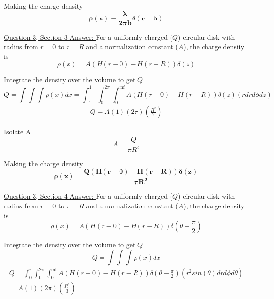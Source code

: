 \documentclass[English]{article}
\begin{document}
    Making the charge density 
    \begin{equation} \label{eq:3-4}
        \boxed{\boldsymbol{\rho(x) = \frac{\lambda}{2 \pi b} \delta(r-b)}}
    \end{equation}
    
    \underline{Question 3, Section 3 Answer: }
    \newline \newline For a uniformly charged ($Q$) circular disk with radius from $r=0$ to $r=R$ and a normalization constant ($A$), the charge density is
    \begin{equation} \label{eq:3-1}
        \rho(x) = A (H(r-0) - H(r-R)) \delta(z)
    \end{equation}
    
    Integrate the density over the volume to get $Q$
    \begin{equation} \label{eq:3-2}
        Q = \int \int \int \rho(x) dx = \int_{-1}^1 \int_0^{2 \pi} \int_0^{\inf} A (H(r-0) - H(r-R)) \delta(z) (r dr d\phi dz)
    \end{equation}  
    \begin{gather*}
        Q = A (1) (2 \pi) (\frac{R^2}{2})
    \end{gather*}

    Isolate A
    \begin{equation} \label{eq:3-3}
        A = \frac{Q}{\pi R^2}
    \end{equation}

    Making the charge density 
    \begin{equation} \label{eq:3-4}
        \boxed{\boldsymbol{\rho(x) = \frac{Q (H(r-0) - H(r-R)) \delta(z)}{\pi R^2}}}
    \end{equation}

    \underline{Question 3, Section 4 Answer: }
    \newline \newline For a uniformly charged ($Q$) circular disk with radius from $r=0$ to $r=R$ and a normalization constant ($A$), the charge density is
    \begin{equation} \label{eq:3-1}
        \rho(x) = A (H(r-0) - H(r-R)) \delta(\theta - \frac{\pi}{2})
    \end{equation}

    Integrate the density over the volume to get $Q$
    \begin{equation} \label{eq:3-2}
        Q = \int \int \int \rho(x) dx 
    \end{equation}  
    \begin{gather*}
        Q = \int_0^{\pi} \int_0^{2 \pi} \int_0^{\inf} A (H(r-0) - H(r-R)) \delta(\theta - \frac{\pi}{2}) (r^2 sin(\theta) dr d\phi d\theta)
        \\ = A (1) (2 \pi) (\frac{R^3}{3})
    \end{gather*}
\end{document}

